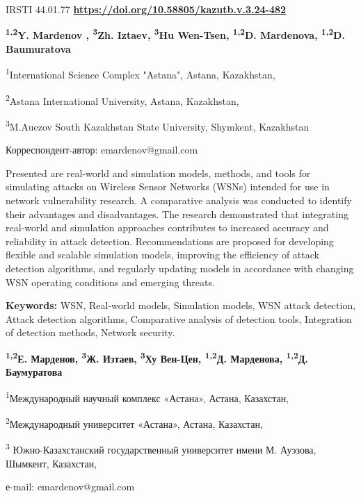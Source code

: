 \newpage
IRSTI 44.01.77
\hfill {\bfseries \href{https://doi.org/10.58805/kazutb.v.3.24-482}{https://doi.org/10.58805/kazutb.v.3.24-482}}


\begin{center}

{\bfseries \textsuperscript{1,2}Y. Mardenov \envelope,
\textsuperscript{3}Zh. Iztaev, \textsuperscript{3}Hu Wen-Tsen,
\textsuperscript{1,2}D. Mardenova, \textsuperscript{1,2}D. Baumuratova}

\textsuperscript{1}International Science Complex "Astana", Astana,
Kazakhstan,

\textsuperscript{2}Astana International University, Astana, Kazakhstan,

\textsuperscript{3}M.Auezov South Kazakhstan State University, Shymkent,
Kazakhstan
\end{center}
\envelope Корреспондент-автор: emardenov@gmail.com\vspace{0.5cm}

Presented are real-world and simulation models, methods, and tools for
simulating attacks on Wireless Sensor Networks (WSNs) intended for use
in network vulnerability research. A comparative analysis was conducted
to identify their advantages and disadvantages. The research
demonstrated that integrating real-world and simulation approaches
contributes to increased accuracy and reliability in attack detection.
Recommendations are proposed for developing flexible and scalable
simulation models, improving the efficiency of attack detection
algorithms, and regularly updating models in accordance with changing
WSN operating conditions and emerging threats.

{\bfseries Keywords:} WSN, Real-world models, Simulation models, WSN
attack detection, Attack detection algorithms, Comparative analysis of
detection tools, Integration of detection methods, Network security.



\begin{center}
{\bfseries \textsuperscript{1,2}Е. Марденов\envelope,
\textsuperscript{3}Ж. Изтаев, \textsuperscript{3}Ху Вен-Цен,
\textsuperscript{1,2}Д. Марденова, \textsuperscript{1,2}Д. Баумуратова}

\textsuperscript{1}Международный научный комплекс «Астана», Астана,
Казахстан,

\textsuperscript{2}Международный университет «Астана», Астана,
Казахстан,

\textsuperscript{3} Южно-Казахстанский государственный университет имени
М. Ауэзова, Шымкент, Казахстан,

е-mail: emardenov@gmail.com
\end{center}

